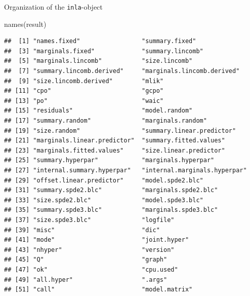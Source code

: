 \documentclass[
  ignorenonframetext,
]{beamer}
\newenvironment{Shaded}{\begin{snugshade}}{\end{snugshade}}
\newcommand{\FunctionTok}[1]{\textcolor[rgb]{0.00,0.00,0.00}{#1}}
\newcommand{\NormalTok}[1]{#1}
\begin{document}
\begin{frame}[fragile]{Organization of the \texttt{inla}-object}
\protect\hypertarget{organization-of-the-inla-object}{}
\tiny

\begin{Shaded}
\begin{Highlighting}[]
\FunctionTok{names}\NormalTok{(result)}
\end{Highlighting}
\end{Shaded}

\begin{verbatim}
##  [1] "names.fixed"                 "summary.fixed"              
##  [3] "marginals.fixed"             "summary.lincomb"            
##  [5] "marginals.lincomb"           "size.lincomb"               
##  [7] "summary.lincomb.derived"     "marginals.lincomb.derived"  
##  [9] "size.lincomb.derived"        "mlik"                       
## [11] "cpo"                         "gcpo"                       
## [13] "po"                          "waic"                       
## [15] "residuals"                   "model.random"               
## [17] "summary.random"              "marginals.random"           
## [19] "size.random"                 "summary.linear.predictor"   
## [21] "marginals.linear.predictor"  "summary.fitted.values"      
## [23] "marginals.fitted.values"     "size.linear.predictor"      
## [25] "summary.hyperpar"            "marginals.hyperpar"         
## [27] "internal.summary.hyperpar"   "internal.marginals.hyperpar"
## [29] "offset.linear.predictor"     "model.spde2.blc"            
## [31] "summary.spde2.blc"           "marginals.spde2.blc"        
## [33] "size.spde2.blc"              "model.spde3.blc"            
## [35] "summary.spde3.blc"           "marginals.spde3.blc"        
## [37] "size.spde3.blc"              "logfile"                    
## [39] "misc"                        "dic"                        
## [41] "mode"                        "joint.hyper"                
## [43] "nhyper"                      "version"                    
## [45] "Q"                           "graph"                      
## [47] "ok"                          "cpu.used"                   
## [49] "all.hyper"                   ".args"                      
## [51] "call"                        "model.matrix"
\end{verbatim}

\normalsize
\end{frame}
\end{document}
